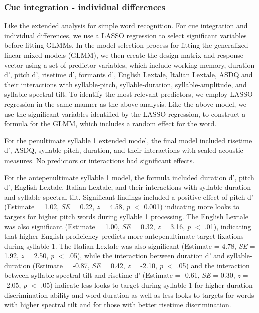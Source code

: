 \subsubsection{Cue integration - individual differences}

Like the extended analysis for simple word recognition. For cue integration and individual differences, we use a LASSO regression to select significant variables before fitting GLMMs. In the model selection process for fitting the generalized linear mixed models (GLMM), we then create the design matrix and response vector using a set of predictor variables, which include working memory, duration d', pitch d', risetime d', formants d', English Lextale, Italian Lextale, ASDQ and their interactions with syllable-pitch, syllable-duration, syllable-amplitude, and syllable-spectral tilt. To identify the most relevant predictors, we employ LASSO regression in the same manner as the above analysis. Like the above model, we use the significant variables identified by the LASSO regression, to construct a formula for the GLMM, which includes a random effect for the word. 

For the penultimate syllable 1 extended model, the final model included risetime d', ASDQ, syllable-pitch, duration, and their interactions with scaled acoustic measures. No predictors or interactions had significant effects.

For the antepenultimate syllable 1 model, the formula included duration d', pitch d', English Lextale, Italian Lextale, and their interactions with syllable-duration and syllable-spectral tilt. Significant findings included a positive effect of pitch d' (Estimate = 1.02, \textit{SE} = 0.22, \textit{z} = 4.58, \textit{p} $<$ 0.001) indicating more looks to targets for higher pitch words during syllable 1 processing. The English Lextale was also significant (Estimate = 1.00, \textit{SE} = 0.32, \textit{z} = 3.16, \textit{p} $<$ .01), indicating that higher English proficiency predicts more antepenultimate target fixations during syllable 1. The Italian Lextale was also significant (Estimate = 4.78, \textit{SE} = 1.92, \textit{z} = 2.50, \textit{p} $<$ .05), while the interaction between duration d' and syllable-duration (Estimate = -0.87, \textit{SE} = 0.42, \textit{z} = -2.10, \textit{p} $<$ .05) and the interaction between syllable-spectral tilt and risetime d' (Estimate = -0.61, \textit{SE} = 0.30, \textit{z} = -2.05, \textit{p} $<$ .05) indicate less looks to target during syllable 1 for higher duration discrimination ability and word duration as well as less looks to targets for words with higher spectral tilt and for those with better risetime discrimination.

